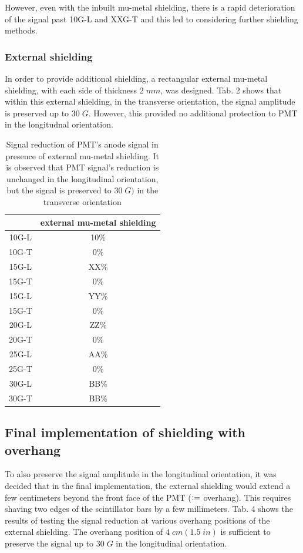 \documentclass[12pt]{article}
\newcommand{\defeq}{\vcentcolon=}
\begin{document}
However, even with the inbuilt mu-metal shielding, there is a rapid deterioration of the signal past 10G-L and XXG-T and this led to considering further shielding methods.

\subsubsection{External shielding}
In order to provide additional shielding, a rectangular external mu-metal shielding, with each side of thickness $2\;mm$, was designed. Tab. 2 shows that within this external shielding, in the transverse orientation, the signal amplitude is preserved up to $30\;G$. However, this provided no additional protection to PMT in the longitudnal orientation.

\begin{table}[H]
	\begin{center}
		\begin{tabular}{|c|c|}
			\hline
	 		& external mu-metal shielding \\
			\hline
 			10G-L & 10\% \\
 			10G-T & 0\% \\ 
 			\hline
 			15G-L & XX\% \\
 			15G-T & 0\% \\
 			\hline
 			15G-L & YY\% \\
 			15G-T & 0\% \\
 			\hline
 			20G-L & ZZ\% \\
 			20G-T & 0\% \\
 			\hline
 			25G-L & AA\% \\
 			25G-T & 0\% \\
 			\hline
 			30G-L & BB\% \\
 			30G-T & BB\% \\
 			\hline
		\end{tabular}
	\end{center}
	\caption{Signal reduction of PMT's anode signal in presence of external mu-metal shielding. It is observed that PMT signal's reduction is unchanged in the longitudinal orientation, but the signal is preserved to $30\;G)$ in the transverse orientation}
\end{table}

\subsection{Final implementation of shielding with overhang}
To also preserve the signal amplitude in the longitudinal orientation, it was decided that in the final implementation, the external shielding would extend a few centimeters beyond the front face of the PMT ($\defeq$ overhang). This requires shaving two edges of the scintillator bars by a few millimeters. Tab. 4 shows the results of testing the signal reduction at various overhang positions of the external shielding. The overhang position of $4\;cm(1.5\;in)$ is sufficient to preserve the signal up to $30\;G$ in the longitudinal orientation.
\end{document}
